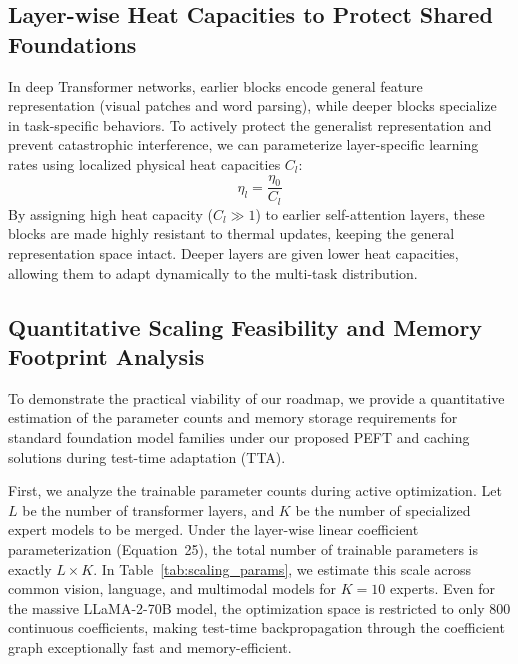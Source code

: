 \documentclass{article}
\theoremstyle{plain}
\theoremstyle{definition}
\theoremstyle{remark}
\begin{document}
\subsection{Layer-wise Heat Capacities to Protect Shared Foundations}
In deep Transformer networks, earlier blocks encode general feature representation (visual patches and word parsing), while deeper blocks specialize in task-specific behaviors. To actively protect the generalist representation and prevent catastrophic interference, we can parameterize layer-specific learning rates using localized physical heat capacities $C_l$:
\begin{equation}
\eta_l = \frac{\eta_0}{C_l}
\end{equation}
By assigning high heat capacity ($C_l \gg 1$) to earlier self-attention layers, these blocks are made highly resistant to thermal updates, keeping the general representation space intact. Deeper layers are given lower heat capacities, allowing them to adapt dynamically to the multi-task distribution.

\subsection{Quantitative Scaling Feasibility and Memory Footprint Analysis}
To demonstrate the practical viability of our roadmap, we provide a quantitative estimation of the parameter counts and memory storage requirements for standard foundation model families under our proposed PEFT and caching solutions during test-time adaptation (TTA).

First, we analyze the trainable parameter counts during active optimization. Let $L$ be the number of transformer layers, and $K$ be the number of specialized expert models to be merged. Under the layer-wise linear coefficient parameterization (Equation~25), the total number of trainable parameters is exactly $L \times K$. In Table~\ref{tab:scaling_params}, we estimate this scale across common vision, language, and multimodal models for $K=10$ experts. Even for the massive LLaMA-2-70B model, the optimization space is restricted to only $800$ continuous coefficients, making test-time backpropagation through the coefficient graph exceptionally fast and memory-efficient.
\end{document}
